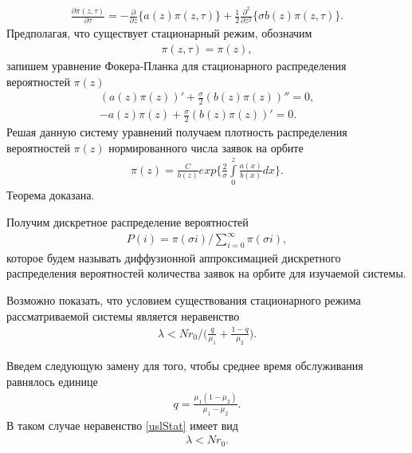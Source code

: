 \begin{align}
	\frac{\partial \pi (z,\tau)}{\partial \tau}=-\frac{\partial}{\partial z}\{a(z)\pi(z,\tau)\} 
	+\frac{1}{2}\frac{\partial^2}{\partial z^2}\{\sigma b(z)\pi(z,\tau)\}.
\end{align}
Предполагая, что существует стационарный режим, обозначим 
\begin{align}
	\pi (z,\tau)=\pi(z),
\end{align}
запишем уравнение Фокера-Планка для стационарного распределения вероятностей $\pi{(z)}$
\begin{align*}
	(a(z)\pi(z))'+\frac{\sigma}{2}(b(z)\pi(z))''=0,\\
	-a(z)\pi(z)+\frac{\sigma}{2}(b(z)\pi(z))'=0.
\end{align*}
Решая данную систему уравнений получаем плотность распределения вероятностей $\pi{(z)}$ нормированного числа заявок на орбите
\begin{align}
	\pi (z)= \frac{C}{b(z)}exp\bigg\{\frac{2}{\sigma} \int\limits_0^z \frac{a(x)}{b(x)}dx\bigg\}.
\end{align} 
Теорема доказана.

Получим дискретное распределение вероятностей
\begin{align}
	P(i)=\pi(\sigma i)/\sum\limits_{i=0}^{\infty} \pi(\sigma i),
\end{align} 
которое будем называть диффузионной аппроксимацией дискретного распределения вероятностей количества заявок на орбите для изучаемой системы.


Возможно показать, что условием существования стационарного
режима рассматриваемой системы является неравенство 
\begin{align}\label{uslStat}
	\lambda<Nr_{0}/ \bigg(\frac{q}{\mu_{1}}+\frac{1-q}{\mu_{2}}\bigg).
\end{align}

Введем следующую замену для того, чтобы среднее время обслуживания равнялось единице
\begin{align*}
	q=\frac{\mu_{1}(1-\mu_{2})}{\mu_{1}-\mu_{2}}.
\end{align*}
В таком случае неравенство \eqref{uslStat} имеет вид
\begin{align*}
	\lambda<Nr_{0}.
\end{align*}